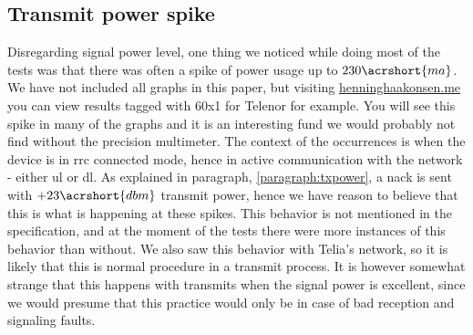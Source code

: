 \documentclass[USenglish]{ifimaster}  %
\begin{document}
\subsection{Transmit power spike}
Disregarding signal power level, one thing we noticed while doing most of the tests was that there was often a spike of power usage up to ${230 \acrshort{ma}}$. We have not included all graphs in this paper, but visiting \url{henninghaakonsen.me} you can view results tagged with 60x1 for Telenor for example. You will see this spike in many of the graphs and it is an interesting fund we would probably not find without the precision multimeter. The context of the occurrences is when the device is in \acrshort{rrc} connected mode, hence in active communication with the network - either \acrshort{ul} or \acrshort{dl}. As explained in paragraph, \vref{paragraph:txpower}, a \acrshort{nack} is sent with ${+23 \acrshort{dbm}}$ transmit power, hence we have reason to believe that this is what is happening at these spikes. This behavior is not mentioned in the specification, and at the moment of the tests there were more instances of this behavior than without. We also saw this behavior with Telia's network, so it is likely that this is normal procedure in a transmit process. It is however somewhat strange that this happens with transmits when the signal power is excellent, since we would presume that this practice would only be in case of bad reception and signaling faults.
\end{document}
